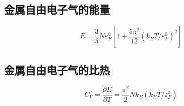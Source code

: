 \documentclass{article}
\begin{document}
\begin{multicols}{2}
\subsection{金属自由电子气的能量}

\begin{equation*}
  E = \frac{3}{5} N \varepsilon_F^0 \left[ 1 + \frac{5\pi^2}{12} \left( k_B T / \varepsilon_F^0 \right)^2 \right]
\end{equation*}

\subsection{金属自由电子气的比热}

\begin{equation*}
  C_V^e = \frac{\partial E}{\partial T} = \frac{\pi^2}{2} Nk_B \left( k_BT / \varepsilon_F^0 \right)
\end{equation*}






























\end{multicols}
\end{document}
